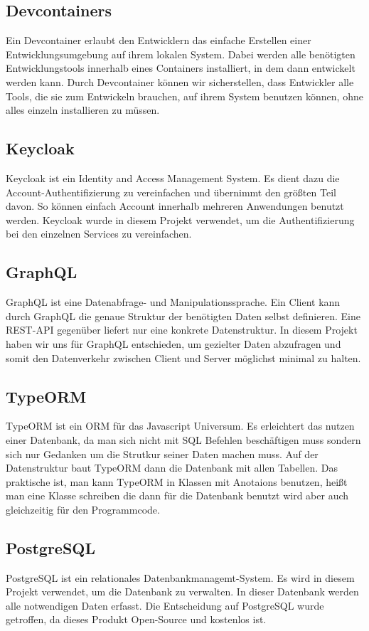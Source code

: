 \subsection{Devcontainers}
    Ein Devcontainer erlaubt den Entwicklern das einfache Erstellen einer Entwicklungsumgebung auf ihrem lokalen System.
    Dabei werden alle benötigten Entwicklungstools innerhalb eines Containers installiert, in dem dann entwickelt werden kann.
    Durch Devcontainer können wir sicherstellen, dass Entwickler alle Tools, die sie zum Entwickeln brauchen, auf ihrem System benutzen können, ohne alles einzeln installieren zu müssen.
\subsection{Keycloak}
    Keycloak ist ein Identity and Access Management System. Es dient dazu die Account-Authentifizierung zu vereinfachen und übernimmt den größten Teil davon.
    So können einfach Account innerhalb mehreren Anwendungen benutzt werden. Keycloak wurde in diesem Projekt verwendet, um die Authentifizierung bei den einzelnen Services zu vereinfachen.
\subsection{GraphQL}
    GraphQL ist eine Datenabfrage- und Manipulationssprache. Ein Client kann durch GraphQL die genaue Struktur der benötigten Daten selbst definieren.
    Eine REST-API gegenüber liefert nur eine konkrete Datenstruktur.
    In diesem Projekt haben wir uns für GraphQL entschieden, um gezielter Daten abzufragen und somit den Datenverkehr zwischen Client und Server möglichst minimal zu halten.
\subsection{TypeORM}
    TypeORM ist ein \ac{ORM} für das Javascript Universum. Es erleichtert das nutzen einer Datenbank, da man sich nicht mit \ac{SQL} Befehlen beschäftigen muss sondern sich nur Gedanken um die Strutkur seiner Daten machen muss.
    Auf der Datenstruktur baut TypeORM dann die Datenbank mit allen Tabellen. Das praktische ist, man kann TypeORM in Klassen mit Anotaions benutzen, heißt man eine Klasse schreiben die dann für die Datenbank benutzt wird
    aber auch gleichzeitig für den Programmcode.
\subsection{PostgreSQL}
    PostgreSQL ist ein relationales Datenbankmanagemt-System. Es wird in diesem Projekt verwendet, um die Datenbank zu verwalten. In dieser Datenbank werden alle notwendigen Daten erfasst.
    Die Entscheidung auf PostgreSQL wurde getroffen, da dieses Produkt Open-Source und kostenlos ist.    
